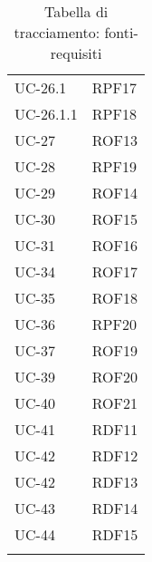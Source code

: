 \begin{longtable}{| p{5cm} | p{5cm} |}
		\rowcolor{LightGray}
		UC-26.1 & RPF17 \\
		UC-26.1.1 & RPF18\\
		\rowcolor{LightGray}
		UC-27 & ROF13 \\
		UC-28 & RPF19 \\
		\rowcolor{LightGray}
		UC-29 & ROF14 \\
		\rowcolor{LightGray}
		UC-30 & ROF15 \\
		UC-31 & ROF16 \\
		\rowcolor{LightGray}
		UC-34 & ROF17\\
		UC-35 & ROF18\\
		\rowcolor{LightGray}
		UC-36 & RPF20\\
		UC-37 & ROF19\\
		\rowcolor{LightGray}
		UC-39 & ROF20\\
		UC-40 & ROF21\\
		\rowcolor{LightGray}
		UC-41 & RDF11\\
		UC-42 & RDF12\\
		\rowcolor{LightGray}
		UC-42 & RDF13\\
		UC-43 & RDF14\\
		\rowcolor{LightGray}
		UC-44 & RDF15\\
		\hline
		\caption{Tabella di tracciamento: fonti-requisiti}
\end{longtable}
\newpage
